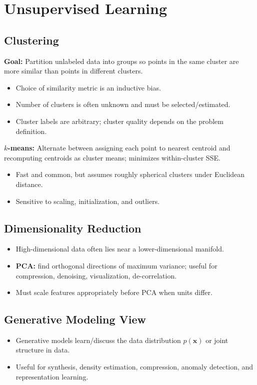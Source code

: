 \documentclass[10pt,twocolumn]{article}
\newcommand{\x}{\mathbf{x}}
\newcommand{\chead}[1]{\vspace{0.15em}\textbf{#1:} }
\begin{document}
\section{Unsupervised Learning}
\subsection{Clustering}
\chead{Goal} Partition unlabeled data into groups so points in the same cluster are more similar than points in different clusters.
\begin{itemize}
  \item Choice of similarity metric is an inductive bias.
  \item Number of clusters is often unknown and must be selected/estimated.
  \item Cluster labels are arbitrary; cluster quality depends on the problem definition.
\end{itemize}
\chead{$k$-means} Alternate between assigning each point to nearest centroid and recomputing centroids as cluster means; minimizes within-cluster SSE.
\begin{itemize}
  \item Fast and common, but assumes roughly spherical clusters under Euclidean distance.
  \item Sensitive to scaling, initialization, and outliers.
\end{itemize}

\subsection{Dimensionality Reduction}
\begin{itemize}
  \item High-dimensional data often lies near a lower-dimensional manifold.
  \item \textbf{PCA:} find orthogonal directions of maximum variance; useful for compression, denoising, visualization, de-correlation.
  \item Must scale features appropriately before PCA when units differ.
\end{itemize}

\subsection{Generative Modeling View}
\begin{itemize}
  \item Generative models learn/discuss the data distribution $p(\x)$ or joint structure in data.
  \item Useful for synthesis, density estimation, compression, anomaly detection, and representation learning.
\end{itemize}
\end{document}
